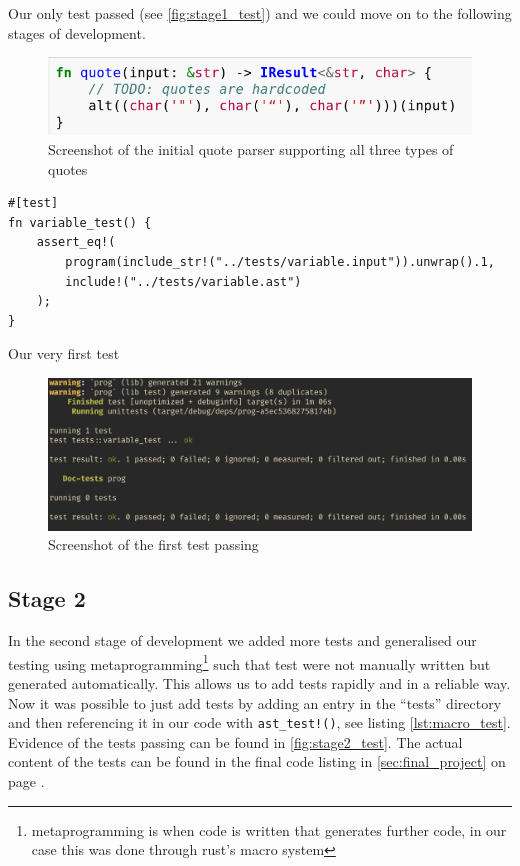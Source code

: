 \documentclass{article}
\begin{document}
Our only test passed (see \autoref{fig:stage1_test}) and we could move on to
the following stages of development.

\begin{figure}
	\includegraphics[width=\textwidth]{initial_quote}
	\caption[Screenshot of the initial quote parser supporting all three types of quotes]{Screenshot\footnotemark{} of the initial quote parser supporting all three types of quotes}
	\label{fig:quote_parser}
\end{figure}


\begin{listing}
	\begin{verbatim}
#[test]
fn variable_test() {
	assert_eq!(
		program(include_str!("../tests/variable.input")).unwrap().1,
		include!("../tests/variable.ast")
	);
}
	\end{verbatim}
	\caption{Our very first test}
	\label{lst:first_test}
\end{listing}

\begin{figure}
	\includegraphics[width=\textwidth]{stage1_test}
	\caption{Screenshot of the first test passing}
	\label{fig:stage1_test}
\end{figure}

\subsection{Stage 2}

In the second stage of development we added more tests and generalised our
testing using metaprogramming\footnote{metaprogramming is when code is written
that generates further code, in our case this was done through rust's macro
system} such that test were not manually written but generated automatically.
This allows us to add tests rapidly and in a reliable way. Now it was possible
to just add tests by adding an entry in the ``tests'' directory and then
referencing it in our code with \texttt{ast_test!()}, see listing
\autoref{lst:macro_test}. Evidence of the tests passing can be found in
\autoref{fig:stage2_test}. The actual content of the tests can be found in the
final code listing in \autoref{sec:final_project} on page
\pageref{sec:final_project}.
\end{document}
